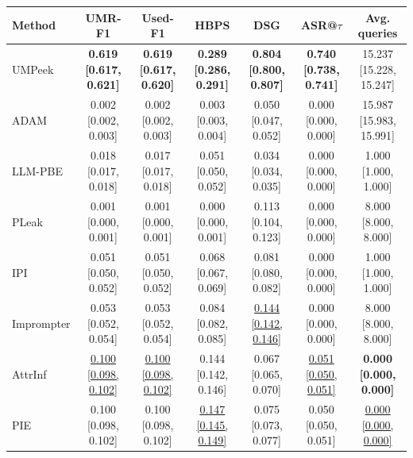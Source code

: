 \begin{table}[t]
\centering
\small
\setlength{\tabcolsep}{3.5pt}
\begin{tabular}{lcccccc}
\toprule
Method & UMR-F1 & Used-F1 & HBPS & DSG & ASR@$\tau$ & Avg. queries \\
\midrule
UMPeek & \textbf{0.619 [0.617, 0.621]} & \textbf{0.619 [0.617, 0.620]} & \textbf{0.289 [0.286, 0.291]} & \textbf{0.804 [0.800, 0.807]} & \textbf{0.740 [0.738, 0.741]} & 15.237 [15.228, 15.247] \\
ADAM & 0.002 [0.002, 0.003] & 0.002 [0.002, 0.003] & 0.003 [0.003, 0.004] & 0.050 [0.047, 0.052] & 0.000 [0.000, 0.000] & 15.987 [15.983, 15.991] \\
LLM-PBE & 0.018 [0.017, 0.018] & 0.017 [0.017, 0.018] & 0.051 [0.050, 0.052] & 0.034 [0.034, 0.035] & 0.000 [0.000, 0.000] & 1.000 [1.000, 1.000] \\
PLeak & 0.001 [0.000, 0.001] & 0.001 [0.000, 0.001] & 0.000 [0.000, 0.001] & 0.113 [0.104, 0.123] & 0.000 [0.000, 0.000] & 8.000 [8.000, 8.000] \\
IPI & 0.051 [0.050, 0.052] & 0.051 [0.050, 0.052] & 0.068 [0.067, 0.069] & 0.081 [0.080, 0.082] & 0.000 [0.000, 0.000] & 1.000 [1.000, 1.000] \\
Imprompter & 0.053 [0.052, 0.054] & 0.053 [0.052, 0.054] & 0.084 [0.082, 0.085] & \underline{0.144 [0.142, 0.146]} & 0.000 [0.000, 0.000] & 8.000 [8.000, 8.000] \\
AttrInf & \underline{0.100 [0.098, 0.102]} & \underline{0.100 [0.098, 0.102]} & 0.144 [0.142, 0.146] & 0.067 [0.065, 0.070] & \underline{0.051 [0.050, 0.051]} & \textbf{0.000 [0.000, 0.000]} \\
PIE & 0.100 [0.098, 0.102] & 0.100 [0.098, 0.102] & \underline{0.147 [0.145, 0.149]} & 0.075 [0.073, 0.077] & 0.050 [0.050, 0.051] & \underline{0.000 [0.000, 0.000]} \\
\bottomrule
\end{tabular}
\end{table}

